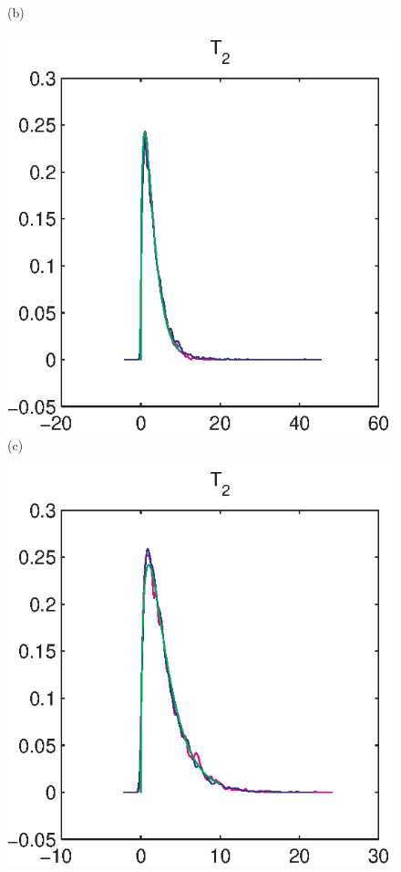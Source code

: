 \documentclass[authoryear,preprint,12pt]{elsarticle}
\begin{document}
\begin{figure}[!htbp]
\begin{center}
\begin{minipage}[]{0.45\textwidth}
      (b)
    \end{minipage}
    \begin{minipage}[]{0.45\textwidth}
      \centering
      \includegraphics[width=\textwidth]{mrmcomplex15ny.eps}
      (c)
    \end{minipage}
    \begin{minipage}[]{0.45\textwidth}
      \centering
      \includegraphics[width=\textwidth]{mrmcomplex15nyhighden.eps}

\end{minipage}
\end{center}
\end{figure}
\end{document}
